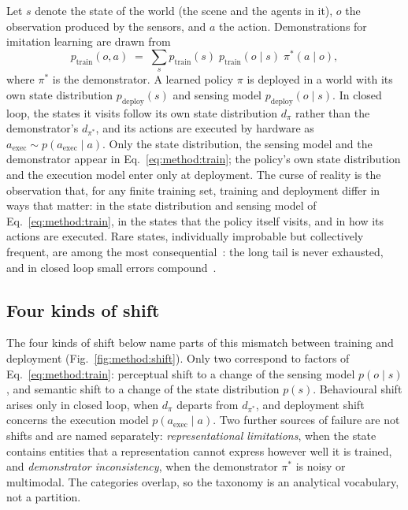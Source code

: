 Let $s$ denote the state of the world (the scene and the agents in it), $o$ the observation produced by the sensors, and $a$ the action. Demonstrations for imitation learning are drawn from
\begin{equation}
  p_{\mathrm{train}}(o,a) \;=\; \sum_{s} p_{\mathrm{train}}(s)\; p_{\mathrm{train}}(o \mid s)\; \pi^{*}(a \mid o),
  \label{eq:method:train}
\end{equation}
where $\pi^{*}$ is the demonstrator. A learned policy $\pi$ is deployed in a world with its own state distribution $p_{\mathrm{deploy}}(s)$ and sensing model $p_{\mathrm{deploy}}(o \mid s)$. In closed loop, the states it visits follow its own state distribution $d_{\pi}$ rather than the demonstrator's $d_{\pi^{*}}$, and its actions are executed by hardware as $a_{\mathrm{exec}} \sim p(a_{\mathrm{exec}} \mid a)$. Only the state distribution, the sensing model and the demonstrator appear in Eq.~\eqref{eq:method:train}; the policy's own state distribution and the execution model enter only at deployment. The curse of reality is the observation that, for any finite training set, training and deployment differ in ways that matter: in the state distribution and sensing model of Eq.~\eqref{eq:method:train}, in the states that the policy itself visits, and in how its actions are executed. Rare states, individually improbable but collectively frequent, are among the most consequential~\cite{liu2024curse}: the long tail is never exhausted, and in closed loop small errors compound~\cite{ross2011dagger}.

\subsection{Four kinds of shift}\label{sec:method:shifts}

The four kinds of shift below name parts of this mismatch between training and deployment (Fig.~\ref{fig:method:shift}). Only two correspond to factors of Eq.~\eqref{eq:method:train}: perceptual shift to a change of the sensing model $p(o \mid s)$, and semantic shift to a change of the state distribution $p(s)$. Behavioural shift arises only in closed loop, when $d_{\pi}$ departs from $d_{\pi^{*}}$, and deployment shift concerns the execution model $p(a_{\mathrm{exec}} \mid a)$. Two further sources of failure are not shifts and are named separately: \emph{representational limitations}, when the state contains entities that a representation cannot express however well it is trained, and \emph{demonstrator inconsistency}, when the demonstrator $\pi^{*}$ is noisy or multimodal. The categories overlap, so the taxonomy is an analytical vocabulary, not a partition.

